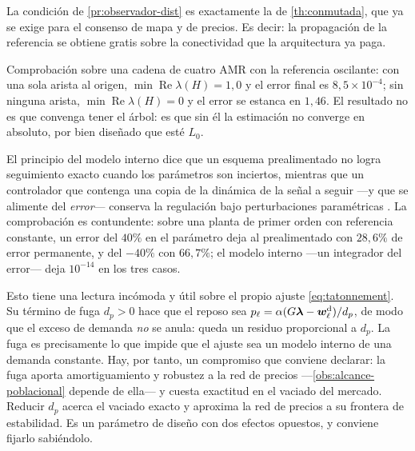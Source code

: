 \begin{observacion}
\label{obs:observador-encaja}
La condición de \cref{pr:observador-dist} es exactamente la de
\cref{th:conmutada}, que ya se exige para el consenso de mapa y de precios. Es
decir: la propagación de la referencia se obtiene gratis sobre la conectividad
que la arquitectura ya paga.

Comprobación sobre una cadena de cuatro AMR con la referencia oscilante: con una
sola arista al origen, $\min\operatorname{Re}\lambda(H)=1{,}0$ y el error final es
$8{,}5\times10^{-4}$; sin ninguna arista, $\min\operatorname{Re}\lambda(H)=0$ y el
error se estanca en $1{,}46$. El resultado no es que convenga tener el árbol: es
que sin él la estimación no converge en absoluto, por bien diseñado que esté
$L_0$.
\end{observacion}

\begin{observacion}
\label{obs:fuga-modelo-interno}
El principio del modelo interno dice que un esquema prealimentado no logra
seguimiento exacto cuando los parámetros son inciertos, mientras que un
controlador que contenga una copia de la dinámica de la señal a seguir —y que se
alimente del \emph{error}— conserva la regulación bajo perturbaciones
paramétricas \cite{cai2022cooperative}. La comprobación es contundente: sobre
una planta de primer orden con referencia constante, un error del $40\%$ en el
parámetro deja al prealimentado con $28{,}6\%$ de error permanente, y del $-40\%$
con $66{,}7\%$; el modelo interno —un integrador del error— deja
$10^{-14}$ en los tres casos.

Esto tiene una lectura incómoda y útil sobre el propio ajuste
\eqref{eq:tatonnement}. Su término de fuga $d_p>0$ hace que el reposo sea
$p_\ell=\alpha(G\bm\lambda-\bm{w}^{\mathrm{d}}_\ell)/d_p$, de modo que el exceso de demanda
\emph{no} se anula: queda un residuo proporcional a $d_p$. La fuga es
precisamente lo que impide que el ajuste sea un modelo interno de una demanda
constante. Hay, por tanto, un compromiso que conviene declarar: la fuga aporta amortiguamiento y robustez a la red de precios
—\cref{obs:alcance-poblacional} depende de ella— y cuesta exactitud en el
vaciado del mercado. Reducir $d_p$ acerca el vaciado exacto y aproxima la red de
precios a su frontera de estabilidad. Es un parámetro de diseño con dos efectos
opuestos, y conviene fijarlo sabiéndolo.
\end{observacion}

